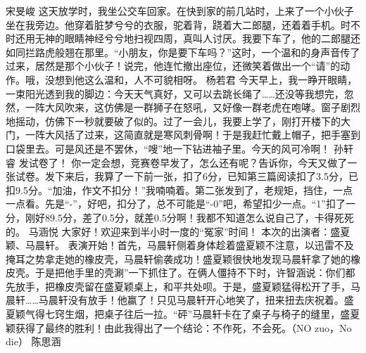 {}\markdownRendererInterblockSeparator
{}宋旻峻\markdownRendererInterblockSeparator
{}这天放学时，我坐公交车回家。在快到家的前几站时，上来了一个小伙子坐在我旁边。他穿着脏梦兮兮的衣服，驼着背，跷着大二郎腿，还着着手机。时不时还用无神的眼睛神经兮兮地扫视四周，真叫人讨厌。我要下车了，他的二郎腿还如同拦路虎般翘在那里。“小朋友，你是要下车吗？”这时，一个温和的身声音传了过来，居然是那个小伙子！说完，他连忙撤出座位，还微笑着做出一个“请”的动作。哦，没想到他这么温和，人不可貌相呀。\markdownRendererInterblockSeparator
{}\markdownRendererInterblockSeparator
{}杨若君\markdownRendererInterblockSeparator
{}今天早上，我一睁开眼睛，一束阳光透到我的脚边：今天天气真好，又可以去跳长绳了……还没等我想完，忽然，一阵大风吹来，这仿佛是一群狮子在怒吼，又好像一群老虎在咆哮。窗子剧烈地摇动，仿佛下一秒就要破了似的。过了一会儿，我要上学了，刚打开楼下的大门，一阵大风括了过来，这简直就是寒风刺骨啊！于是我赶忙戴上帽子，把手塞到口袋里去。可是风还是不罢休，“嗖”地一下钻进袖子里。今天的风可冷啊！ \markdownRendererInterblockSeparator
{}\markdownRendererInterblockSeparator
{}孙轩睿\markdownRendererInterblockSeparator
{}发试卷了！\markdownRendererInterblockSeparator
{}你一定会想，竞赛卷早发了，怎么还有呢？告诉你，今天又做了一张试卷。发下来后，我算了一下前一张，扣了6分，已知第三篇阅读扣了3.5分，已扣9.5分。“加油，作文不扣分！”我喃喃着。第二张发到了，老规矩，挡住，一点一点看。先是“-”，好吧，扣分了，总不可能是“-0”吧，希望扣少一点。“1”扣了一分，刚好89.5分，差了0.5分，就差0.5分啊！我都不知道怎么说自己了，卡得死死的。\markdownRendererInterblockSeparator
{}\markdownRendererInterblockSeparator
{}马涵悦\markdownRendererInterblockSeparator
{}大家好！欢迎来到半小时一度的“冤家”时间！\markdownRendererInterblockSeparator
{}本次的出演者：盛夏颖、马晨轩。\markdownRendererInterblockSeparator
{}表演开始！首先，马晨轩侧着身体趁着盛夏颖不注意，以迅雷不及掩耳之势拿走她的橡皮壳，马晨轩偷袭成功！盛夏颖很快地发现马晨轩拿了她的橡皮壳。于是把他手里的壳涮”一下抓住了。在俩人僵持不下时，许智涵说：你们都先放手，把橡皮壳留在盛夏颖桌上，和平共处呗。于是，盛夏颖猛得松开了手，马晨轩……马晨轩没有放手！他赢了！只见马晨轩开心地笑了，扭来扭去庆祝着。盛夏颖气得七窍生烟，把桌子往后一拉。“砰”马晨轩卡在了桌子与椅子的缝里，盛夏颖获得了最终的胜利！由此我得出了一个结论：不作死，不会死。（NO zuo，No die）\markdownRendererInterblockSeparator
{}\markdownRendererInterblockSeparator
{}陈思涵\markdownRendererInterblockSeparator
